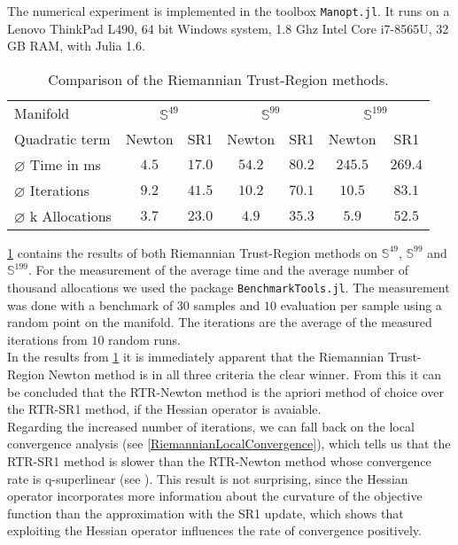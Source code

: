 The numerical experiment is implemented in the toolbox \lstinline!Manopt.jl!. It runs on a Lenovo ThinkPad L490, 64 bit Windows system, 1.8 Ghz Intel Core i7-8565U, 32 GB RAM, with Julia 1.6.
\begin{table}[H]
    \centering
        \begin{tabular}{lcccccc}
            \toprule
            Manifold & \multicolumn{2}{c}{$\mathbb{S}^{49}$}& \multicolumn{2}{c}{$\mathbb{S}^{99}$} & \multicolumn{2}{c}{$\mathbb{S}^{199}$}\\ 
            \cmidrule(lr){2-3} \cmidrule(lr){4-5} \cmidrule(lr){6-7}
            Quadratic term & Newton & SR1 & Newton & SR1 & Newton & SR1 \\ 

            $\varnothing$ Time in ms & $4.5$ & $17.0$ & $54.2$ & $80.2$ & $245.5$ & $269.4$\\ 
            $\varnothing$ Iterations & $9.2$ & $41.5$ & $10.2$ & $70.1$ & $10.5$ & $83.1$ \\
            $\varnothing$ k Allocations& $3.7$ & $23.0$ & $4.9$ & $35.3$ & $5.9$ & $52.5$ \\
            \bottomrule
        \end{tabular}
    \caption{Comparison of the Riemannian Trust-Region methods.} \label{tab:Results}
\end{table}
\cref{tab:Results} contains the results of both Riemannian Trust-Region methods on $\mathbb{S}^{49}$, $\mathbb{S}^{99}$ and $\mathbb{S}^{199}$. For the measurement of the average time and the average number of thousand allocations we used the package \lstinline!BenchmarkTools.jl!. The measurement was done with a benchmark of $30$ samples and $10$ evaluation per sample using a random point on the manifold. The iterations are the average of the measured iterations from $10$ random runs. \\
In the results from \cref{tab:Results} it is immediately apparent that the Riemannian Trust-Region Newton method is in all three criteria the clear winner. From this it can be concluded that the RTR-Newton method is the apriori method of choice over the RTR-SR1 method, if the Hessian operator is avaiable. \\
Regarding the increased number of iterations, we can fall back on the local convergence analysis (see \cref{RiemannianLocalConvergence}), which tells us that the RTR-SR1 method is slower than the RTR-Newton method whose convergence rate is q-superlinear (see \cite[Theorem~4.13]{AbsilBakerGallivan:2007}). This result is not surprising, since the Hessian operator incorporates more information about the curvature of the objective function than the approximation with the SR1 update, which shows that exploiting the Hessian operator influences the rate of convergence positively. \\ 

